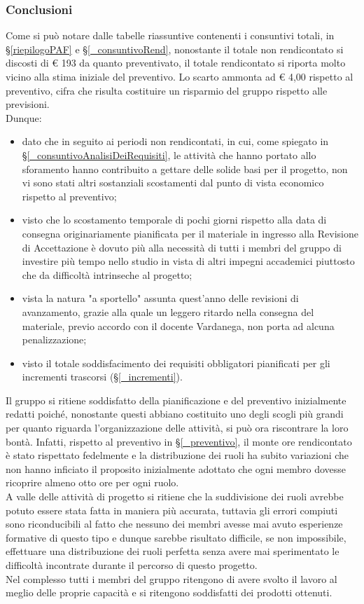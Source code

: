 \subsubsection{Conclusioni}
Come si può notare dalle tabelle riassuntive contenenti i consuntivi totali, in \S\ref{riepilogoPAF} e \S\ref{_consuntivoRend}, nonostante il totale non rendicontato si discosti di € 193 da quanto preventivato, il totale rendicontato si riporta molto vicino alla stima iniziale del preventivo. Lo scarto ammonta ad € 4,00 rispetto al preventivo, cifra che risulta costituire un risparmio del gruppo rispetto alle previsioni. \\
Dunque:
\begin{itemize}
	\item dato che in seguito ai periodi non rendicontati, in cui, come spiegato in \S\ref{_consuntivoAnalisiDeiRequisiti}, le attività che hanno portato allo sforamento hanno contribuito a gettare delle solide basi per il progetto, non vi sono stati altri sostanziali scostamenti dal punto di vista economico rispetto al preventivo;
	\item visto che lo scostamento temporale di pochi giorni rispetto alla data di consegna originariamente pianificata per il materiale in ingresso alla Revisione di Accettazione è dovuto più alla necessità di tutti i membri del gruppo di investire più tempo nello studio in vista di altri impegni accademici piuttosto che da difficoltà intrinseche al progetto;
	\item vista la natura "a sportello" assunta quest'anno delle revisioni di avanzamento, grazie alla quale un leggero ritardo nella consegna del materiale, previo accordo con il docente Vardanega, non porta ad alcuna penalizzazione;  
	\item visto il totale soddisfacimento dei requisiti obbligatori pianificati per gli incrementi trascorsi (\S\ref{_incrementi}).
\end{itemize}
  Il gruppo si ritiene soddisfatto della pianificazione e del preventivo inizialmente redatti poiché, nonostante questi abbiano costituito uno degli scogli più grandi per quanto riguarda l'organizzazione delle attività, si può ora riscontrare la loro bontà. Infatti, rispetto al preventivo in \S\ref{_preventivo}, il monte ore rendicontato è stato rispettato fedelmente e la distribuzione dei ruoli ha subito variazioni che non hanno inficiato il proposito inizialmente adottato che ogni membro dovesse ricoprire almeno otto ore per ogni ruolo. \\
  A valle delle attività di progetto si ritiene che la suddivisione dei ruoli avrebbe potuto essere stata fatta in maniera più accurata, tuttavia gli errori compiuti sono riconducibili al fatto che nessuno dei membri avesse mai avuto esperienze formative di questo tipo e dunque sarebbe risultato difficile, se non impossibile, effettuare una distribuzione dei ruoli perfetta senza avere mai sperimentato le difficoltà incontrate durante il percorso di questo progetto.\\
  Nel complesso tutti i membri del gruppo ritengono di avere svolto il lavoro al meglio delle proprie capacità e si ritengono soddisfatti dei prodotti ottenuti. \\ 

